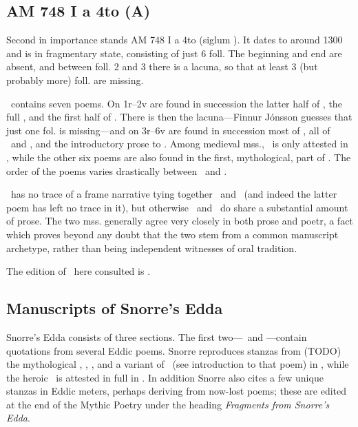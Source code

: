 \subsection{AM 748 I a 4to (A)}

Second in importance stands AM 748 I a 4to (siglum \AM).  It dates to around 1300 and is in fragmentary state, consisting of just 6 foll.  The beginning and end are absent, and between foll. 2 and 3 there is a lacuna, so that at least 3 (but probably more) foll. are missing.

\AM\ contains seven poems.  On 1r–2v are found in succession the latter half of \Harbardsljod, the full \Baldrsdraumar, and the first half of \Skirnismal.  There is then the lacuna—Finnur Jónsson guesses that just one fol. is missing—and on 3r–6v are found in succession most of \Vafthrudnismal, all of \Grimnismal\ and \Hymiskvida, and the introductory prose to \Volundarkvida.  Among medieval mss., \Baldrsdraumar\ is only attested in \AM, while the other six poems are also found in the first, mythological, part of \Regius. The order of the poems varies drastically between \AM\ and \Regius.

\AM\ has no trace of a frame narrative tying together \Hymiskvida\ and \Lokasenna\ (and indeed the latter poem has left no trace in it), but otherwise \AM\ and \Regius\ do share a substantial amount of prose.  The two mss. generally agree very closely in both prose and poetr, a fact which proves beyond any doubt that the two stem from a common manuscript archetype, rather than being independent witnesses of oral tradition.

The edition of \AM\ here consulted is \textcite{Finnur1896}.

\subsection{Manuscripts of Snorre’s Edda}

Snorre’s Edda consists of three sections.  The first two—\Gylfaginning\ and \Skaldskaparmal—contain quotations from several Eddic poems.  Snorre reproduces stanzas from (TODO) the mythological \Voluspa, \Vafthrudnismal, \Grimnismal, and a variant of \Lokasenna\ (see introduction to that poem) in \Gylfaginning, while the heroic \Grottasongr\ is attested in full in \Skaldskaparmal.  In addition Snorre also cites a few unique stanzas in Eddic meters, perhaps deriving from now-lost poems; these are edited at the end of the Mythic Poetry under the heading \emph{Fragments from Snorre’s Edda}.

